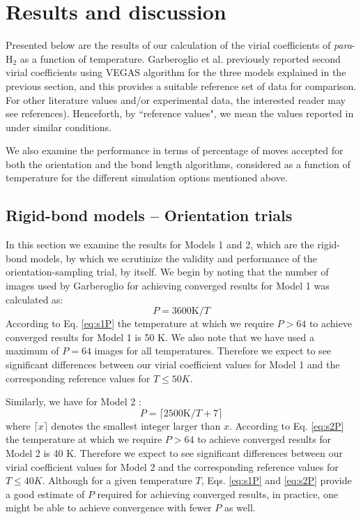     \section{Results and discussion}
    \label{sec:Results and discussion}
        Presented below are the results of our calculation of the virial coefficients of \emph{para}-H$_2$ as a function of temperature. Garberoglio et al.\cite{Garberoglio2014} previously reported second virial coefficients using VEGAS\cite{Lepage1972} algorithm for the three models explained in the previous section, and this provides a suitable reference set of data for comparison. For other literature values and/or experimental data, the interested reader may see references\cite{Goodwin1963, Patkowski2008, Leachman2009, Sakoda2012, Garberoglio2012, Garberoglio2014}). Henceforth, by ``reference values", we mean the values reported in \cite{Garberoglio2014} under similar conditions.

        We also examine the performance in terms of percentage of moves accepted for both the orientation and the bond length algorithms, considered as a function of temperature for the different simulation options mentioned above.

        \subsection{Rigid-bond models -- Orientation trials}
            In this section we examine the results for Models 1 and 2, which are the rigid-bond models, by which we scrutinize the validity and performance of the orientation-sampling trial, by itself. We begin by noting that the number of images used by Garberoglio for achieving converged results \cite{Patkowski2008} for Model 1 was calculated as:
            \begin{equation}
            \label{eq:s1P}
                P = 3600 \textrm{K}/T
            \end{equation}
According to Eq. \eqref{eq:s1P} the temperature at which we require $P > 64$ to achieve converged results for Model 1 is 50 K. We also note that we have used a maximum of $P = 64$ images for all temperatures. Therefore we expect to see significant differences between our virial coefficient values for Model 1 and the corresponding reference values for $T \le 50 K$.
            
            Similarly, we have for Model 2 \cite{Garberoglio2012}:
            \begin{equation}
            \label{eq:s2P}
                P = \lceil 2500 \textrm{K}/T + 7 \rceil
            \end{equation}
            where $\lceil x \rceil$ denotes the smallest integer larger than $x$.
According to Eq. \eqref{eq:s2P} the temperature at which we require $P > 64$ to achieve converged results for Model 2 is 40 K. Therefore we expect to see significant differences between our virial coefficient values for Model 2 and the corresponding reference values for $T \le 40 K$. Although for a given temperature $T$, Eqs. \eqref{eq:s1P} and \eqref{eq:s2P} provide a good estimate of $P$ required for achieving converged results, in practice, one might be able to achieve convergence with fewer $P$ as well.

